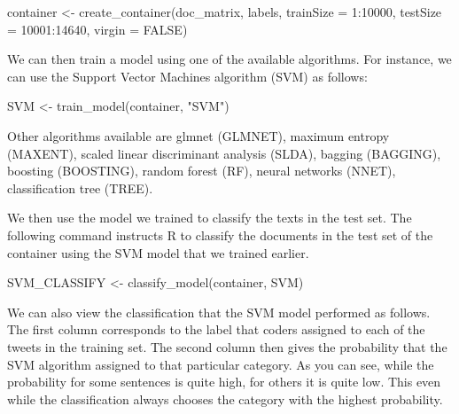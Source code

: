 \documentclass[
]{article}
\newenvironment{Shaded}{\begin{snugshade}}{\end{snugshade}}
\newcommand{\AttributeTok}[1]{\textcolor[rgb]{0.77,0.63,0.00}{#1}}
\newcommand{\ConstantTok}[1]{\textcolor[rgb]{0.00,0.00,0.00}{#1}}
\newcommand{\DecValTok}[1]{\textcolor[rgb]{0.00,0.00,0.81}{#1}}
\newcommand{\FunctionTok}[1]{\textcolor[rgb]{0.00,0.00,0.00}{#1}}
\newcommand{\NormalTok}[1]{#1}
\newcommand{\OtherTok}[1]{\textcolor[rgb]{0.56,0.35,0.01}{#1}}
\newcommand{\SpecialCharTok}[1]{\textcolor[rgb]{0.00,0.00,0.00}{#1}}
\newcommand{\StringTok}[1]{\textcolor[rgb]{0.31,0.60,0.02}{#1}}
\begin{document}
\begin{Shaded}
\begin{Highlighting}[]
\NormalTok{container }\OtherTok{\textless{}{-}} \FunctionTok{create\_container}\NormalTok{(doc\_matrix, labels, }\AttributeTok{trainSize =} \DecValTok{1}\SpecialCharTok{:}\DecValTok{10000}\NormalTok{, }\AttributeTok{testSize =} \DecValTok{10001}\SpecialCharTok{:}\DecValTok{14640}\NormalTok{, }\AttributeTok{virgin =} \ConstantTok{FALSE}\NormalTok{)}
\end{Highlighting}
\end{Shaded}

We can then train a model using one of the available algorithms. For instance, we can use the Support Vector Machines algorithm (SVM) as follows:

\begin{Shaded}
\begin{Highlighting}[]
\NormalTok{SVM }\OtherTok{\textless{}{-}} \FunctionTok{train\_model}\NormalTok{(container, }\StringTok{"SVM"}\NormalTok{)}
\end{Highlighting}
\end{Shaded}

Other algorithms available are glmnet (GLMNET), maximum entropy (MAXENT), scaled linear discriminant analysis (SLDA), bagging (BAGGING), boosting (BOOSTING), random forest (RF), neural networks (NNET), classification tree (TREE).

We then use the model we trained to classify the texts in the test set. The following command instructs R to classify the documents in the test set of the container using the SVM model that we trained earlier.

\begin{Shaded}
\begin{Highlighting}[]
\NormalTok{SVM\_CLASSIFY }\OtherTok{\textless{}{-}} \FunctionTok{classify\_model}\NormalTok{(container, SVM)}
\end{Highlighting}
\end{Shaded}

We can also view the classification that the SVM model performed as follows. The first column corresponds to the label that coders assigned to each of the tweets in the training set. The second column then gives the probability that the SVM algorithm assigned to that particular category. As you can see, while the probability for some sentences is quite high, for others it is quite low. This even while the classification always chooses the category with the highest probability.
\end{document}
